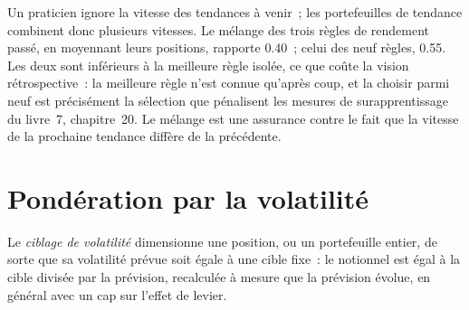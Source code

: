 \begin{omfigure}

\label{fig:s1:trend-following:lookbacks}
\end{omfigure}

Un praticien ignore la vitesse des tendances à venir~; les portefeuilles de tendance combinent donc plusieurs vitesses. Le mélange des trois règles de rendement passé, en moyennant leurs
positions, rapporte 0.40~; celui des neuf règles, 0.55. Les deux sont inférieurs à la meilleure règle isolée, ce que coûte la vision rétrospective~: la meilleure règle n'est connue
qu'après coup, et la choisir parmi neuf est précisément la sélection que pénalisent les mesures de surapprentissage du livre~7, chapitre~20. Le mélange est une assurance contre
le fait que la vitesse de la prochaine tendance diffère de la précédente.

\section{Pondération par la volatilité}

\begin{definition}\label{def:s1:trend-following:voltarget}
Le \emph{ciblage de volatilité} dimensionne une position, ou un portefeuille entier, de sorte que sa volatilité prévue soit égale à une cible fixe~:
le notionnel est égal à la cible divisée par la prévision, recalculée à mesure que la prévision évolue, en général avec un cap sur l'effet de levier.
\end{definition}

